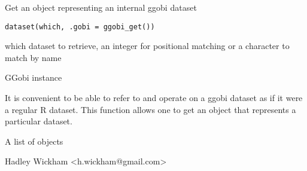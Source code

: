 \begin{Description}\relax
Get an object representing an internal ggobi dataset
\end{Description}
\begin{Usage}
\begin{verbatim}dataset(which, .gobi = ggobi_get())\end{verbatim}
\end{Usage}
\begin{Arguments}
\begin{ldescription}
\item[\code{which}] which dataset to retrieve, an integer for positional matching or a character to match by name
\item[\code{.gobi}] GGobi instance
\end{ldescription}
\end{Arguments}
\begin{Details}\relax
It is convenient to be able to refer to and operate on a ggobi
dataset as if it were a regular R dataset.  This function allows one to
get an  object that represents a particular
dataset.
\end{Details}
\begin{Value}
A list of  objects
\end{Value}
\begin{Author}\relax
Hadley Wickham <h.wickham@gmail.com>
\end{Author}
\begin{SeeAlso}\relax
{}
\end{SeeAlso}
\begin{Examples}
\begin{ExampleCode}\end{ExampleCode}
\end{Examples}

